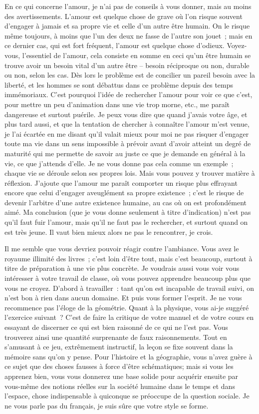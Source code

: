 \documentclass[french,twoside]{book} %
\begin{document}
En ce qui concerne l'amour, je n'ai pas de conseils à vous donner, mais au moins des avertissements. L'amour est quelque chose de grave où l'on risque souvent d'engager à jamais et sa propre vie et celle d'un autre être humain. On le risque même toujours, à moins que l'un des deux ne fasse de l'autre son jouet ; mais en ce dernier cas, qui est fort fréquent, l'amour est quelque chose d'odieux. Voyez-vous, l'essentiel de l'amour, cela consiste en somme en ceci qu'un être humain se trouve avoir un besoin vital d'un autre être – besoin réciproque ou non, durable ou non, selon les cas. Dès lors le problème est de concilier un pareil besoin avec la liberté, et les hommes se sont débattus dans ce problème depuis des temps immémoriaux. C'est pourquoi l'idée de rechercher l'amour pour voir ce que c'est, pour mettre un peu d'animation dans une vie trop morne, etc., me paraît dangereuse et surtout puérile. Je peux vous dire que quand j'avais votre âge, et plus tard aussi, et que la tentation de chercher à connaître l'amour m'est venue, je l'ai écartée en me disant qu'il valait mieux pour moi ne pas risquer d'engager toute ma vie dans un sens impossible à prévoir avant d'avoir atteint un degré de maturité qui me permette de savoir au juste ce que je demande en général à la vie, ce que j'attends d'elle. Je ne vous donne pas cela comme un exemple ; chaque vie se déroule selon ses propres lois. Mais vous pouvez y trouver matière à réflexion. J'ajoute que l'amour me paraît comporter un risque plus effrayant encore que celui d'engager aveuglément sa propre existence ; c'est le risque de devenir l'arbitre d'une autre existence humaine, au cas où on est profondément aimé. Ma conclusion (que je vous donne seulement à titre d'indication) n'est pas qu'il faut fuir l'amour, mais qu'il ne faut pas le rechercher, et surtout quand on est très jeune. Il vaut bien mieux alors ne pas le rencontrer, je crois.\par
Il me semble que vous devriez pouvoir réagir contre l'ambiance. Vous avez le royaume illimité des livres ; c'est loin d'être tout, mais c'est beaucoup, surtout à titre de préparation à une vie plus concrète. Je voudrais aussi vous voir vous intéresser à votre travail de classe, où vous pouvez apprendre beaucoup plus que vous ne croyez. D'abord à travailler : tant qu'on est incapable de travail suivi, on n'est bon à rien dans aucun domaine. Et puis vous former l'esprit. Je ne vous recommence pas l'éloge de la géométrie. Quant à la physique, vous ai-je suggéré l'exercice suivant ? C'est de faire la critique de votre manuel et de votre cours en essayant de discerner ce qui est bien raisonné de ce qui ne l'est pas. Vous trouverez ainsi une quantité surprenante de faux raisonnements. Tout en s'amusant à ce jeu, extrêmement instructif, la leçon se fixe souvent dans la mémoire sans qu'on y pense. Pour l'histoire et la géographie, vous n'avez guère à ce sujet que des choses fausses à force d'être schématiques; mais si vous les apprenez bien, vous vous donnerez une base solide pour acquérir ensuite par vous-même des notions réelles sur la société humaine dans le temps et dans l'espace, chose indispensable à quiconque se préoccupe de la question sociale. Je ne vous parle pas du français, je suis sûre que votre style se forme.\par
\end{document}
